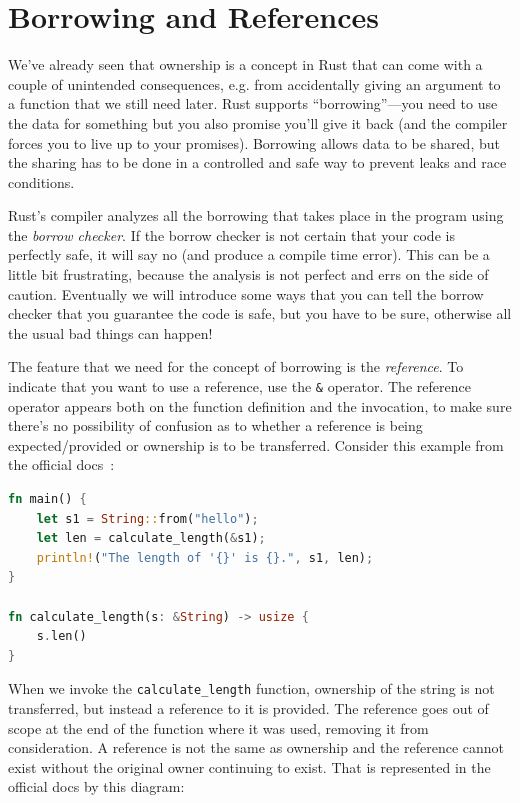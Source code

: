 




\section*{Borrowing and References}
We've already seen that ownership is a concept in Rust that can come with a couple of unintended consequences, e.g. from accidentally giving an argument to a function that we still need later. Rust supports ``borrowing''---you need to use the data for something but you also promise you'll give it back (and the compiler forces you to live up to your promises). Borrowing allows data to be shared, but the sharing has to be done in a controlled and safe way to prevent leaks and race conditions.

Rust's compiler analyzes all the borrowing that takes place in the program using the \textit{borrow checker}. If the borrow checker is not certain that your code is perfectly safe, it will say no (and produce a compile time error). This can be a little bit frustrating, because the analysis is not perfect and errs on the side of caution. Eventually we will introduce some ways that you can tell the borrow checker that you guarantee the code is safe, but you have to be sure, otherwise all the usual bad things can happen!

The feature that we need for the concept of borrowing is the \textit{reference}. To indicate that you want to use a reference, use the \texttt{\&} operator. The reference operator appears both on the function definition and the invocation, to make sure there's no possibility of confusion as to whether a reference is being expected/provided or ownership is to be transferred.  Consider this example from the official docs~\cite{rustdocs}:

\begin{lstlisting}[language=Rust]
fn main() {
    let s1 = String::from("hello");
    let len = calculate_length(&s1);
    println!("The length of '{}' is {}.", s1, len);
}

fn calculate_length(s: &String) -> usize {
    s.len()
}
\end{lstlisting}

When we invoke the \texttt{calculate\_length} function, ownership of the string is not transferred, but instead a reference to it is provided. The reference goes out of scope at the end of the function where it was used, removing it from consideration. A reference is not the same as ownership and the reference cannot exist without the original owner continuing to exist. That is represented in the official docs by this diagram:

